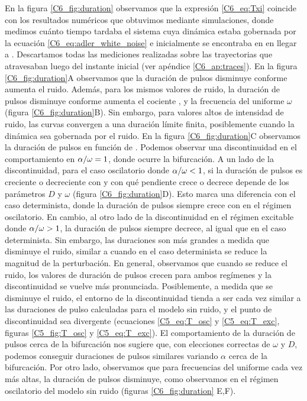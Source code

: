 \documentclass[./main.tex]{subfiles}
\begin{document}
En la figura \ref{C6_fig:duration} observamos que la expresión \ref{C6_eq:Txi} coincide con los resultados numéricos que obtuvimos mediante simulaciones, donde medimos cuánto tiempo tardaba el sistema cuya dinámica estaba gobernada por la ecuación \ref{C6_eq:adler_white_noise} e inicialmente se encontraba en \xxi en llegar a \xxe. Descartamos todas las mediciones realizadas sobre las trayectorias que atravesaban \xxi luego del instante inicial (ver apéndice \ref{C6_ap:traces}). En la figura \ref{C6_fig:duration}A observamos que la duración de pulsos disminuye conforme aumenta el ruido. Además, para los mismos valores de ruido, la duración de pulsos disminuye conforme aumenta el cociente \dddelta, y la frecuencia del uniforme $\omega$ (figura \ref{C6_fig:duration}B). Sin embargo, para valores altos de intensidad de ruido, las curvas convergen a una duración límite finita, posiblemente cuando la dinámica sea gobernada por el ruido. En la figura \ref{C6_fig:duration}C observamos la duración de pulsos en función de \dddelta. Podemos observar una discontinuidad en el comportamiento en $\alpha/\omega = 1$, donde ocurre la bifurcación. A un lado de la discontinuidad, para el caso oscilatorio donde $\alpha/\omega < 1$, si la duración de pulsos es creciente o decreciente con \dddelta y con qué pendiente crece o decrece depende de los parámetros $D$ y $\omega$ (figura \ref{C6_fig:duration}D). Esto marca una diferencia con el caso determinista, donde la duración de pulsos siempre crece con \dddelta en el régimen oscilatorio. En cambio, al otro lado de la discontinuidad en el régimen excitable donde $\alpha/\omega > 1$, la duración de pulsos siempre decrece, al igual que en el caso determinista. Sin embargo, las duraciones son  más grandes a medida que disminuye el ruido, similar a cuando en el caso determinista se reduce la magnitud de la perturbación. En general, observamos que cuando se reduce el ruido, los valores de duración de pulsos crecen para ambos regímenes y la discontinuidad se vuelve más pronunciada. Posiblemente, a medida que se disminuye el ruido, el entorno de la discontinuidad tienda a ser cada vez similar a las duraciones de pulso calculadas para el modelo sin ruido, y el punto de discontinuidad sea divergente (ecuaciones \ref{C5_eq:T_osc} y  \ref{C5_eq:T_exc}, figuras \ref{C5_fig:T_osc} y \ref{C5_eq:T_exc}). El comportamiento de la duración de pulsos cerca de la bifurcación nos sugiere que, con elecciones correctas de $\omega$ y $D$, podemos conseguir duraciones de pulsos similares variando $\alpha$ cerca de la bifurcación. Por otro lado, observamos que para frecuencias del uniforme cada vez más altas, la duración de pulsos disminuye, como observamos en el régimen oscilatorio del modelo sin ruido (figuras \ref{C6_fig:duration} E,F).  
\end{document}
